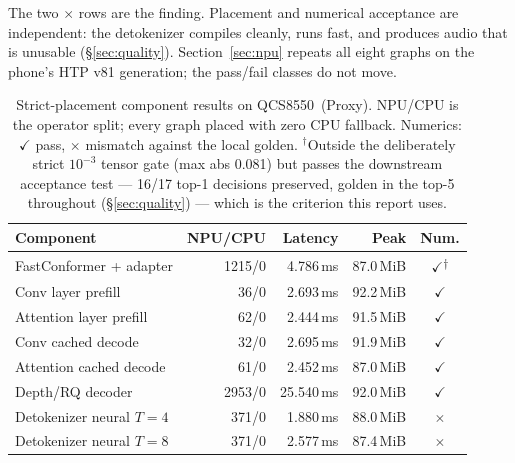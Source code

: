 \documentclass[10pt,twocolumn,letterpaper]{article}
\newcommand{\pass}{\ensuremath{\checkmark}}
\newcommand{\fail}{\textcolor{warn}{\ensuremath{\times}}}
\newcommand{\taskpass}{\ensuremath{\checkmark}\textsuperscript{\kern-1pt$\dagger$}}
\begin{document}
The two \fail{} rows are the finding. Placement and numerical acceptance are
independent: the detokenizer compiles cleanly, runs fast, and produces audio
that is unusable (\S\ref{sec:quality}). Section~\ref{sec:npu} repeats all
eight graphs on the phone's HTP v81 generation; the pass/fail classes do not
move.

\begin{table}[t]
\centering
\footnotesize
\setlength{\tabcolsep}{3pt}
\caption{Strict-placement component results on QCS8550~(Proxy). NPU/CPU is the
operator split; every graph placed with zero CPU fallback. Numerics:
$\checkmark$ pass, \textcolor{warn}{$\times$} mismatch against the local
golden. $^{\dagger}$Outside the deliberately strict $10^{-3}$ tensor gate
(max abs 0.081) but passes the downstream acceptance test --- 16/17 top-1
decisions preserved, golden in the top-5 throughout (\S\ref{sec:quality}) ---
which is the criterion this report uses.}
\label{tab:components}
\begin{tabular}{@{}lrrrc@{}}
\toprule
\textbf{Component} & \textbf{NPU/CPU} & \textbf{Latency} & \textbf{Peak} & \textbf{Num.} \\
\midrule
FastConformer + adapter & 1215/0 & 4.786\,ms & 87.0\,MiB & \taskpass \\
Conv layer prefill & 36/0 & 2.693\,ms & 92.2\,MiB & \pass \\
Attention layer prefill & 62/0 & 2.444\,ms & 91.5\,MiB & \pass \\
Conv cached decode & 32/0 & 2.695\,ms & 91.9\,MiB & \pass \\
Attention cached decode & 61/0 & 2.452\,ms & 87.0\,MiB & \pass \\
Depth/RQ decoder & 2953/0 & 25.540\,ms & 92.0\,MiB & \pass \\
Detokenizer neural $T{=}4$ & 371/0 & 1.880\,ms & 88.0\,MiB & \fail \\
Detokenizer neural $T{=}8$ & 371/0 & 2.577\,ms & 87.4\,MiB & \fail \\
\bottomrule
\end{tabular}
\end{table}
\end{document}
